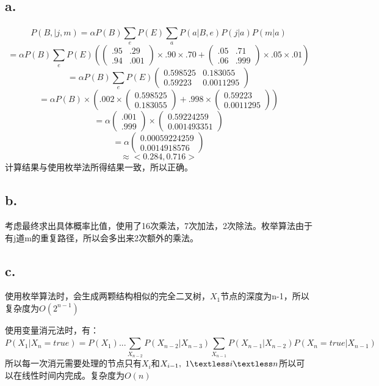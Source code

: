 \documentclass{article}
\begin{document}
	\subsection*{a.}
	$$P(B,|j,m)=\alpha P(B)\sum_{e}^{ }P(E)\sum_{a}^{ }P(a|B,e)P(j|a)P(m|a)$$
	$$=\alpha P(B)\sum_{e}^{ }P(E)(\left(
	\begin{matrix}
	.95 & .29 \\
	.94 & .001
	\end{matrix}
	\right)\times .90 \times .70+\left(
	\begin{matrix}
	.05 & .71\\
	.06 & .999
	\end{matrix}
	\right)\times .05\times .01)$$
	$$=\alpha P(B)\sum_{e}^{ }P(E)\left(
	\begin{matrix}
	0.598525 & 0.183055\\
	0.59223 & 0.0011295
	\end{matrix}
	\right)$$
	$$=\alpha P(B)\times (.002\times \left(
	\begin{matrix}
	0.598525\\
	0.183055
	\end{matrix}
	\right)+.998\times \left(
	\begin{matrix}
	0.59223\\
	0.0011295
	\end{matrix}
	\right))$$
	$$=\alpha \left(
	\begin{matrix}
	.001\\
	.999
	\end{matrix}
	\right) \times
	\left(
	\begin{matrix}
	0.59224259\\
	0.001493351
	\end{matrix}
	\right)$$
	$$=\alpha \left(
	\begin{matrix}
	0.00059224259\\
	0.0014918576
	\end{matrix}
	\right)$$
	$$\approx <0.284,0.716>$$
	计算结果与使用枚举法所得结果一致，所以正确。
	\subsection*{b.}
	考虑最终求出具体概率比值，使用了16次乘法，7次加法，2次除法。枚举算法由于有j道m的重复路径，所以会多出来2次额外的乘法。
	\subsection*{c.}
	\par{使用枚举算法时，会生成两颗结构相似的完全二叉树，$X_{1}$节点的深度为n-1，所以复杂度为$O(2^{n-1})$}
	\par{使用变量消元法时，有：\\
	$$P(X_{1}|X_{n}=true)=P(X_{1})...\sum_{X_{n-2}}^{ }P(X_{n-2}|X_{n-3})\sum_{X_{n-1}}^{}P(X_{n-1}|X_{n-2})P(X_{n}=true|X_{n-1})$$
	所以每一次消元需要处理的节点只有$X_{i}$和$X_{i-1},\ 1\textless i\textless n$所以可以在线性时间内完成。复杂度为$O(n)$}
\end{document}
